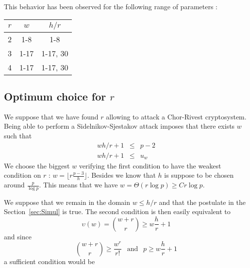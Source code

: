 \documentclass[12pt,a4paper,titlepage]{article}
\begin{document}
This behavior has been observed for the following range of parameters :

\begin{center}
\begin{tabular}{|c|c|c|}
\hline
$r$ & $w$ 	& $h/r$ \\
\hline
2	& 1-8	& 1-8	\\
\hline
3	& 1-17	& 1-17, 30 \\
\hline
4	& 1-17	& 1-17, 30 \\
\hline
\end{tabular}
\end{center}



\subsection{Optimum choice for $r$}

We suppose that we have found $r$ allowing to attack a Chor-Rivest cryptosystem. Being able to perform a Sidelnikov-Sjestakov attack imposes that there exists $w$ such that
\begin{eqnarray*}
wh/r+1 &\leq & p-2 \\
wh/r+1 &\leq & u_w 
\end{eqnarray*}
We choose the biggest $w$ verifying the first condition to have the weakest condition on $r$ : $w = \lfloor r \frac{p-3}{h} \rfloor $. Besides we know that $h$ is suppose to be chosen around $\frac{p}{\log p}$. This means that we have $w = \Theta(r \log p) \geq C r \log p$.

We suppose that we remain in the domain $w \leq h/r$ and that the postulate in the Section~\ref{sec:Simul} is true. The second condition is then easily equivalent to
$$ \upsilon(w) = \binom{w+r}{r} \geq w\frac{h}{r}+1 $$
and since
$$ \binom{w+r}{r} \geq \frac{w^r}{r!} \ \ \text{ and } \ \ p \geq w\frac{h}{r}+1 $$
a sufficient condition would be



\end{document}
